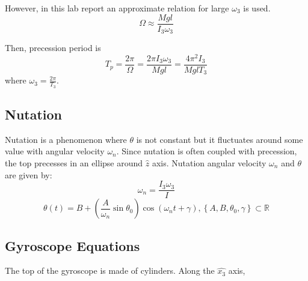 However, in this lab report an approximate relation for large $\omega_{3}$ is used.
\begin{equation}
  \label{eq:theory:precession_frequency}
  \Omega \approx \frac{Mgl}{I_{3}\omega_{3}}
\end{equation}

Then, precession period is
\begin{equation}
  \label{eq:theory:precession_period}
  T_{p} = \frac{2\pi}{\Omega} = \frac{2\pi I_{3} \omega_3}{Mgl} = \frac{4\pi^{2} I_{3}}{MglT_{3}}
\end{equation}
where $\omega_{3} = \frac{2\pi}{T_{3}}$.

\subsection{Nutation}
\label{sec:theory:nutation}

Nutation is a phenomenon where $\theta$ is not constant but it fluctuates around some value with angular velocity $\omega_{n}$. Since nutation is often coupled with precession, the top precesses in an ellipse around $\hat{z}$ axis. Nutation angular velocity $\omega_{n}$ and $\theta$ are given by:
\begin{equation}
  \label{eq:theory:nutation_frequency}
  \omega_{n} = \frac{I_{3}\omega_3}{I}
\end{equation}
\begin{equation}
  \label{eq:theory:nutation_angle}
  \theta(t) = B + (\frac{A}{\omega_n}\sin \theta_{0})\cos(\omega_{n}t + \gamma), \left\{ A, B, \theta_{0}, \gamma \right\} \subset \mathbb{R}
\end{equation}

\subsection{Gyroscope Equations}
\label{sec:theory:gyroscope}

The top of the gyroscope is made of cylinders. Along the $\hat{x_{3}}$ axis,  
